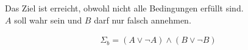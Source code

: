 Das Ziel ist erreicht, obwohl nicht alle Bedingungen erfüllt sind.\\

$A$ soll wahr sein und $B$ darf nur falsch annehmen.

\begin{eqnarray}
\Sigma_{b} = (A \lor \lnot A) \land  (B \lor \lnot B) 
\end{eqnarray}

